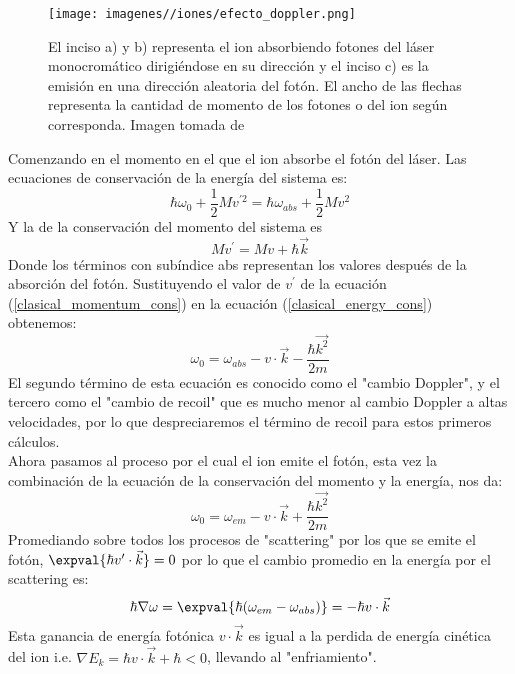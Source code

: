 \begin{figure}
    \centering
    \texttt{[image: imagenes//iones/efecto\_doppler.png]}
    \caption{El inciso a) y b) representa el ion absorbiendo fotones del láser monocromático dirigiéndose en su dirección y el inciso c) es la emisión en una dirección aleatoria del fotón. El ancho de las flechas representa la cantidad de momento de los fotones o del ion según corresponda. Imagen tomada de \cite{Bernardini_trapped_ions}}
    \label{fig:efecto-dopples}
\end{figure}
Comenzando en el momento en el que el ion absorbe el fotón del láser.
Las ecuaciones de conservación de la energía del sistema es:
\begin{equation}\label{clasical_energy_cons}
    \hbar\omega_{0}+\frac{1}{2}Mv^{\prime 2}=\hbar\omega_{abs}+\frac{1}{2}Mv^{2}
\end{equation}
Y la de la conservación del momento del sistema es
\begin{equation}\label{clasical_momentum_cons}
   Mv^{\prime}=Mv+\hbar\Vec{k}
\end{equation}
Donde los términos con subíndice abs representan los valores después de la absorción del fotón. Sustituyendo el valor de $v^{\prime}$ de la ecuación (\ref{clasical_momentum_cons}) en la ecuación (\ref{clasical_energy_cons}) obtenemos:\
\begin{equation}
    \omega_{0}=\omega_{abs}-v\cdot\Vec{k}-\frac{\hbar\Vec{k^{2}}}{2m}
\end{equation}
El segundo término de esta ecuación es conocido como el "cambio Doppler", y el tercero como el "cambio de recoil" que es mucho menor al cambio Doppler a altas velocidades, por lo que despreciaremos el término de recoil para estos primeros cálculos.\\
Ahora pasamos al proceso por el cual el ion emite el fotón, esta vez la combinación de la ecuación de la conservación del momento y la energía, nos da:
\begin{equation}
    \omega_{0}=\omega_{em}-v\cdot\Vec{k}+\frac{\hbar\Vec{k^{2}}}{2m}
\end{equation}
Promediando sobre todos los procesos de "scattering" por los que se emite el fotón, $\expval{\hbar v^{\prime}\cdot\vec{k}}=0$ por lo que el cambio promedio en la energía por el scattering es:
\begin{equation}
    \hbar\nabla\omega=\expval{\hbar(\omega_{em}-\omega_{abs})}=-\hbar v\cdot\Vec{k}
\end{equation}
Esta ganancia de energía fotónica $v\cdot\Vec{k}$ es igual a la perdida de energía cinética del ion i.e. $\nabla E_{k}=\hbar v\cdot\Vec{k}+\hbar<0$, llevando al "enfriamiento".\\

